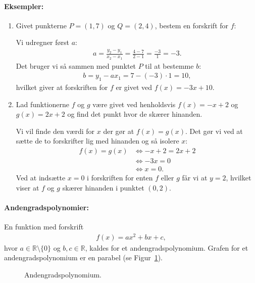 \paragraph*{Eksempler:}
\begin{enumerate}
\item Givet punkterne $P=(1,7)$ og $Q=(2,4)$, bestem en forskrift for $f$:

Vi udregner først $a$:
\begin{align*}
a= \frac{y_2-y_1}{x_2-x_1} = \frac{4-7}{2-1}=\frac{-3}{1}=-3.
\end{align*}
Det bruger vi så sammen med punktet $P$ til at bestemme $b$:
\begin{align*}
b=y_1 - ax_1=7- (-3) \cdot 1 = 10, 
\end{align*}
hvilket giver at forskriften for $f$ er givet ved $f(x)=-3x+10$.
\item Lad funktionerne $f$ og $g$ være givet ved henholdsvis $f(x)=-x+2$ og $g(x)=2x+2$ og find det punkt hvor de skærer hinanden.

Vi vil finde den værdi for $x$ der gør at $f(x)=g(x)$. Det gør vi ved at sætte de to forskrifter lig med hinanden og så isolere $x$:
\begin{align*}
f(x)=g(x) &\Leftrightarrow -x+2 = 2x+2 \\
&\Leftrightarrow -3x = 0 \\
&\Leftrightarrow x = 0.
\end{align*}
Ved at indsætte $x=0$ i forskriften for enten $f$ eller $g$ får vi at $y=2$, hvilket viser at $f$ og $g$ skærer hinanden i punktet $(0,2)$.
\end{enumerate}

\paragraph*{Andengradspolynomier:}
En funktion med forskrift
\begin{align*}
f(x)=ax^2+bx+c,
\end{align*}
hvor $a \in \mathbb{R} \setminus \{0\}$ og $b,c \in \mathbb{R}$, kaldes for et andengradspolynomium. Grafen for et andengradspolynomium er en parabel (se Figur~\ref{fig:funktioner3to}).
\begin{figure}[!htbp]
  \centering
  \caption{Andengradspolynomium.}
  \label{fig:funktioner3to}
\end{figure}

